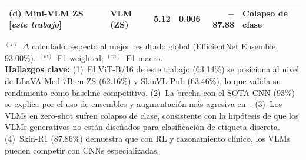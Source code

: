 \begin{table}[htbp]
{\begin{tabular}{@{}llrrrl@{}}
\rowcolor{thiswork}
(d) Mini-VLM ZS [\textit{este trabajo}]
  & VLM (ZS) & 5.12 & 0.006 & $-$87.88 & Colapso de clase \\

\bottomrule
\end{tabular}%
}
\vspace{4pt}
\begin{minipage}{\textwidth}
  \footnotesize
  $^{(\star)}$~$\Delta$ calculado respecto al mejor resultado global
  (EfficientNet Ensemble, 93.00\%).
  $^{(w)}$~F1 weighted; $^{(m)}$~F1 macro.\\[4pt]
  \textbf{Hallazgos clave:}
  (1)~El ViT-B/16 de este trabajo (63.14\%) se posiciona al nivel
  de LLaVA-Med-7B en ZS (62.16\%) y SkinVL-Pub (63.46\%),
  lo que valida su rendimiento como baseline competitivo.
  (2)~La brecha con el SOTA CNN (93\%) se explica por el uso de
  ensembles y augmentación más agresiva en~\cite{SkinHealthMate2024}.
  (3)~Los VLMs en zero-shot sufren colapso de clase, consistente
  con la hipótesis de que los VLMs generativos no están diseñados
  para clasificación de etiqueta discreta.
  (4)~Skin-R1 (87.86\%) demuestra que con RL y razonamiento
  clínico, los VLMs pueden competir con CNNs especializadas.
\end{minipage}
\end{table}
